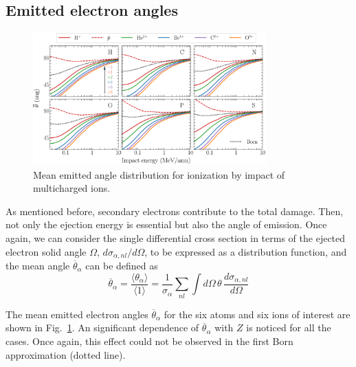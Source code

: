 \documentclass[10pt,showpacs,twocolumn]{revtex4}
\begin{document}
\subsection{Emitted electron angles}
\label{subsec:meanang}

\begin{figure}[t!]
\centering
\includegraphics[width=0.8\textwidth]{ang_mean.eps}
\caption{Mean emitted angle distribution for ionization by impact of
multicharged ions.}
\label{fig:emittedang}
\end{figure} 

As mentioned before, secondary electrons contribute to the total damage. 
Then, not only the ejection energy is essential but also the angle 
of emission. Once again, we can consider the single differential cross 
section in terms of the ejected electron solid angle $\Omega$, 
$d\sigma_{\alpha,nl}/d\Omega$, to be expressed as a distribution function, 
and the mean angle $\overline{\theta}_{\alpha}$ can be defined as
\begin{equation}
\overline{\theta}_{\alpha}=\frac{\langle\theta_{\alpha}\rangle}
{\langle 1\rangle}=\frac{1}{\sigma_{\alpha}}\sum\limits_{nl}
\int d\Omega\,\theta\,\frac{d\sigma_{\alpha,nl}}{d\Omega}
\end{equation}


The mean emitted electron angles $\overline{\theta}_{\alpha}$ for the 
six atoms and six ions of interest are shown in Fig.~\ref{fig:emittedang}.
An significant dependence of $\overline{\theta}_{\alpha}$ with $Z$ is 
noticed for all the cases. Once again, this effect could not be 
observed in the first Born approximation (dotted line).
\end{document}
